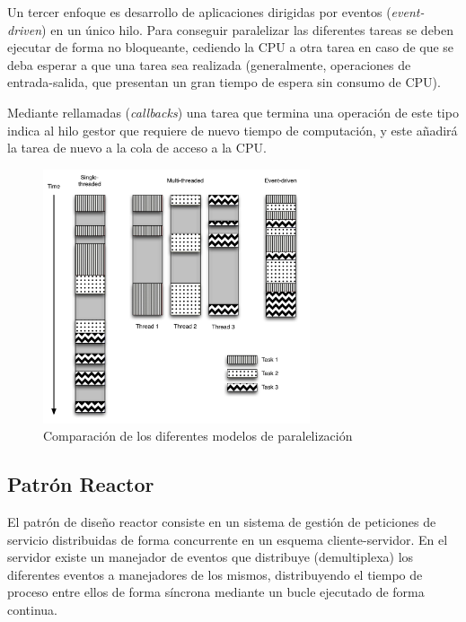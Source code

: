 Un tercer enfoque es desarrollo de aplicaciones dirigidas por eventos (\textit{event-driven}) en un único hilo. Para conseguir paralelizar las diferentes tareas se deben ejecutar de forma no bloqueante, cediendo la CPU a otra tarea en caso de que se deba esperar a que una tarea sea realizada (generalmente, operaciones de entrada-salida, que presentan un gran tiempo de espera sin consumo de CPU).

Mediante rellamadas (\textit{callbacks}) una tarea que termina una operación de este tipo indica al hilo gestor que requiere de nuevo tiempo de computación, y este añadirá la tarea de nuevo a la cola de acceso a la CPU.

\begin{figure}[H]
\centering
\includegraphics[width=0.7\textwidth]{Chapter2/Figures/threadcomparison}
\caption{Comparación de los diferentes modelos de paralelización}
\label{fig:threadcomparison}
\end{figure}

\subsection{Patrón Reactor}


El patrón de diseño reactor\cite{Coplien95reactor} consiste en un sistema de gestión de peticiones de servicio distribuidas de forma concurrente en un esquema cliente-servidor. En el servidor existe un manejador de eventos que distribuye (demultiplexa) los diferentes eventos a manejadores de los mismos, distribuyendo el tiempo de proceso entre ellos de forma síncrona mediante un bucle ejecutado de forma continua.

